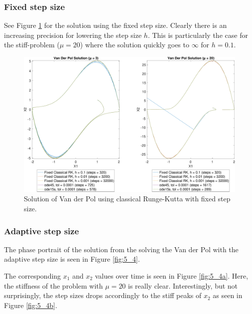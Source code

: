 \subsubsection*{Fixed step size}
See Figure \ref{fig:5_4fix} for the solution using the fixed step size. Clearly there is an increasing precision for lowering the step size $h$. This is particularly the case for the stiff-problem ($\mu = 20$) where the solution quickly goes to $\infty$ for $h=0.1$.

\begin{figure}[htb]
    \centering
    \includegraphics[width=\textwidth]{plots/5_4fix_a.pdf}
    \caption{Solution of Van der Pol using classical Runge-Kutta with fixed step size.}
    \label{fig:5_4fix}
\end{figure}







\subsubsection*{Adaptive step size}
The phase portrait of the solution from the solving the Van der Pol with the adaptive step size is seen in Figure \ref{fig:5_4}.

The corresponding $x_1$ and $x_2$ values over time is seen in Figure \ref{fig:5_4a}. Here, the stiffness of the problem with $\mu = 20$ is really clear. Interestingly, but not surprisingly, the step sizes drops accordingly to the stiff peaks of $x_2$ as seen in Figure \ref{fig:5_4b}.


